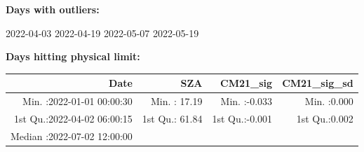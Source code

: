 \documentclass[
  10pt,
  a4paper,oneside]{article}
\begin{document}
\normalsize

\textbf{Days with outliers:}

2022-04-03 2022-04-19 2022-05-07 2022-05-19

\textbf{Days hitting physical limit:}

\footnotesize

\begin{longtable}[]{@{}rrrr@{}}
\toprule
\begin{minipage}[b]{0.33\columnwidth}\raggedleft
Date\strut
\end{minipage} & \begin{minipage}[b]{0.19\columnwidth}\raggedleft
SZA\strut
\end{minipage} & \begin{minipage}[b]{0.19\columnwidth}\raggedleft
CM21\_sig\strut
\end{minipage} & \begin{minipage}[b]{0.19\columnwidth}\raggedleft
CM21\_sig\_sd\strut
\end{minipage}\tabularnewline
\midrule
\endhead
\begin{minipage}[t]{0.33\columnwidth}\raggedleft
Min. :2022-01-01 00:00:30\strut
\end{minipage} & \begin{minipage}[t]{0.19\columnwidth}\raggedleft
Min. : 17.19\strut
\end{minipage} & \begin{minipage}[t]{0.19\columnwidth}\raggedleft
Min. :-0.033\strut
\end{minipage} & \begin{minipage}[t]{0.19\columnwidth}\raggedleft
Min. :0.000\strut
\end{minipage}\tabularnewline
\begin{minipage}[t]{0.33\columnwidth}\raggedleft
1st Qu.:2022-04-02 06:00:15\strut
\end{minipage} & \begin{minipage}[t]{0.19\columnwidth}\raggedleft
1st Qu.: 61.84\strut
\end{minipage} & \begin{minipage}[t]{0.19\columnwidth}\raggedleft
1st Qu.:-0.001\strut
\end{minipage} & \begin{minipage}[t]{0.19\columnwidth}\raggedleft
1st Qu.:0.002\strut
\end{minipage}\tabularnewline
\begin{minipage}[t]{0.33\columnwidth}\raggedleft
Median :2022-07-02 12:00:00\strut
\end{minipage} & \begin{minipage}[t]{0.19\columnwidth}\raggedleft

\end{minipage}
\end{longtable}
\end{document}
